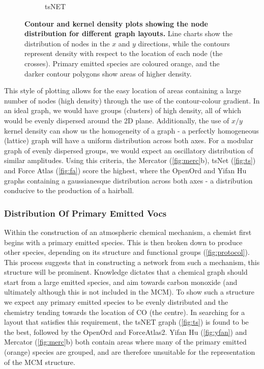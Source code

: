 \begin{figure}[H]
\begin{subfigure}[b]{.49\textwidth}
         \caption{tsNET}
         \label{fig:ts}
     \end{subfigure}
      \hfill
        \caption{ \textbf{Contour and kernel density plots showing the node distribution for different graph layouts.} Line charts show the distribution of nodes in the $x$ and $y$ directions, while the contours represent density with respect to the location of each node (the crosses). Primary emitted species are coloured orange, and the darker contour polygons show areas of higher density.}
        \label{fig:densitycompare}
\end{figure}

This style of plotting allows for the easy location of areas containing a large number of nodes (high density) through the use of the contour-colour gradient. In an ideal graph, we would have groups (clusters) of high density, all of which would be evenly dispersed around the 2D plane.
Additionally, the use of $x/y$ kernel density can show us the homogeneity of a graph - a perfectly homogeneous (lattice) graph will have a uniform distribution across both axes. For a modular graph of evenly dispersed groups, we would expect an oscillatory distribution of similar amplitudes. Using this criteria, the Mercator (\autoref{fig:merc}b), tsNet (\autoref{fig:ts}) and Force Atlas (\autoref{fig:fa}) score the highest, where the OpenOrd and Yifan Hu graphs containing a gaussianesque distribution across both axes - a distribution conducive to the production of a hairball.

\subsubsection{Distribution Of Primary Emitted Vocs}

Within the construction of an atmospheric chemical mechanism, a chemist first begins with a primary emitted species. This is then broken down to produce other species, depending on its structure and functional groups (\autoref{fig:protocol}). This process suggests that in constructing a network from such a mechanism, this structure will be prominent. Knowledge dictates that a chemical graph should start from a large emitted species, and aim towards carbon monoxide (and ultimately  although this is not included in the MCM). To show such a structure we expect any primary emitted species to be evenly distributed and the chemistry tending towards the location of CO (the centre). In searching for a layout that satisfies this requirement, the tsNET graph (\autoref{fig:ts}) is found to be the best, followed by the OpenOrd and ForceAtlas2. Yifan Hu (\autoref{fig:yfan}) and Mercator (\autoref{fig:merc}b) both contain areas where many of the primary emitted (orange) species are grouped, and are therefore unsuitable for the representation of the MCM structure.


